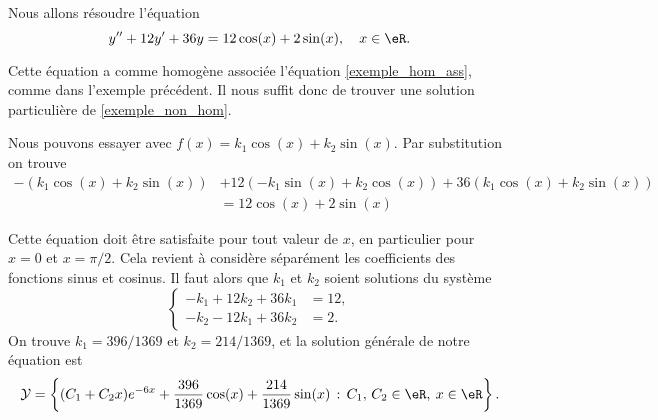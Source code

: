 \begin{example}
  Nous allons résoudre l'équation
  \begin{equation}
    y'' + 12y' + 36 y = 12\cos(x) + 2\sin(x), \quad x\in\eR.
  \end{equation}

Cette équation a comme homogène associée l'équation \eqref{exemple_hom_ass}, comme dans l'exemple précédent. Il nous suffit donc de trouver une solution particulière de \eqref{exemple_non_hom}.

Nous pouvons essayer avec $f(x)= k_1\cos(x) + k_2\sin(x)$. Par substitution on trouve
\begin{equation*}
  \begin{aligned}
    -\left(k_1\cos(x) + k_2\sin(x)\right) & +12 \left(-k_1\sin(x) + k_2\cos(x)\right) + 36\left(k_1\cos(x) + k_2\sin(x)\right)\\
    &= 12\cos(x) + 2\sin(x)
  \end{aligned}
\end{equation*}

Cette équation doit \^etre satisfaite pour tout valeur de $x$, en particulier pour $x= 0$ et $x = \pi/2$. Cela revient à considère séparément les coefficients des fonctions sinus et cosinus. Il faut alors que $k_1$ et $k_2$ soient solutions du système
\begin{equation*}
  \begin{cases}
    -k_1 + 12 k_2 + 36 k_1& = 12, \\
    -k_2 - 12 k_1 + 36 k_2& = 2.
  \end{cases}
\end{equation*}
On trouve $k_1= 396/1369$ et $k_2 = 214/1369$, et la solution générale de notre équation est
\begin{equation*}
   \mathcal{Y}  = \left\{(C_1  +C_2x) e^{-6 x} +\frac{396}{1369}\cos(x) + \frac{214}{1369}\sin(x) \,:\, C_1,\, C_2 \in \eR, \: x\in \eR\right\}.
\end{equation*}
\end{example}

